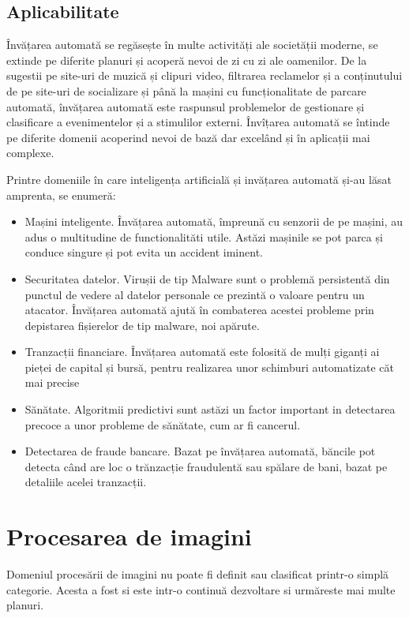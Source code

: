 	\subsection{Aplicabilitate}
	Învățarea automată se regăsește în multe activități ale societății moderne, se extinde pe diferite planuri și acoperă nevoi de zi cu zi ale oamenilor. De la sugestii pe site-uri de muzică și clipuri video, filtrarea reclamelor și a conținutului de pe site-uri de socializare  și până la mașini cu funcționalitate de parcare automată, învățarea automată este raspunsul problemelor de gestionare și clasificare a evenimentelor și a stimulilor externi. 
	Învîțarea automată se întinde pe diferite domenii acoperind nevoi de bază dar excelând și în aplicații mai complexe.
	
	Printre domeniile în care inteligența artificială și invățarea automată și-au lăsat amprenta, se enumeră:
	
	\begin{itemize}
		\item Mașini inteligente. Învățarea automată, împreună cu senzorii de pe mașini, au adus o multitudine de functionalităti utile. Astăzi mașinile se pot parca și conduce singure și pot evita un accident iminent.
		
		\item Securitatea datelor. Virușii de tip Malware sunt o problemă persistentă din punctul de vedere al datelor personale ce prezintă o valoare pentru un atacator. Învățarea automată ajută în combaterea acestei probleme prin depistarea fișierelor de tip malware, noi apărute.
		
		\item Tranzacții financiare. Învățarea automată este folosită de mulți giganți ai pieței de capital și bursă, pentru realizarea unor schimburi automatizate căt mai precise
		
		\item Sănătate. Algoritmii predictivi sunt astăzi un factor important in detectarea precoce a unor probleme de sănătate, cum ar fi cancerul.
		
		\item Detectarea de fraude bancare. Bazat pe învățarea automată, băncile pot detecta când are loc o trănzacție fraudulentă sau spălare de bani, bazat pe detaliile acelei tranzacții.			
	\end{itemize}
	
	\vfill
	
	
	\section{Procesarea de imagini}
	Domeniul procesării de imagini nu poate fi definit sau clasificat printr-o simplă categorie. Acesta a fost si este intr-o continuă dezvoltare si urmăreste mai multe planuri. 
	
